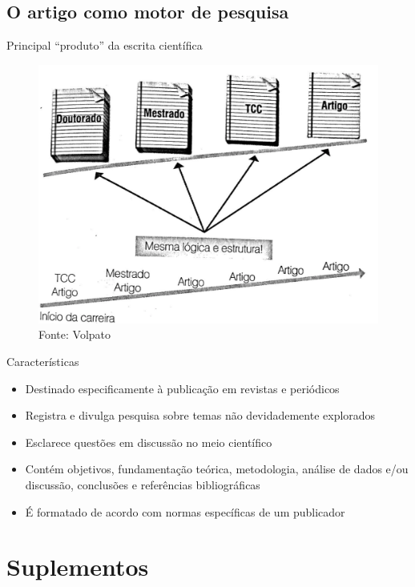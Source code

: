 \subsection*{O artigo como motor de pesquisa}

\begin{frame}{Principal ``produto'' da escrita científica}
\begin{figure}
\includegraphics[scale=0.4]{figs/01/ilustracao-artigo}
\caption{Fonte: Volpato}
\end{figure}
\end{frame}

\begin{frame}{Características}
\begin{itemize}
\item Destinado especificamente à publicação em revistas e periódicos
\item Registra e divulga pesquisa sobre temas não devidademente explorados
\item Esclarece questões em discussão no meio científico
\item Contém objetivos, fundamentação teórica, metodologia, análise de dados e/ou discussão, conclusões e referências bibliográficas
\item É formatado de acordo com normas específicas de um publicador
\end{itemize}
\end{frame}

\section{Suplementos}

